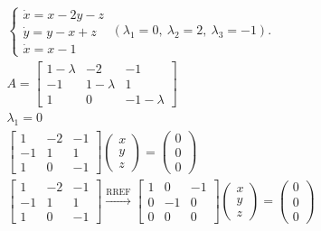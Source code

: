 \documentclass{article}
\begin{document}
\addtolength{\jot}{1pt}
\begin{fleqn}[1\parindent]
  \begin{gather*}
    \begin{cases}
      \dot{x}=x-2y-z \\ 
      \dot{y}=y-x+z \\ 
      \dot{x}=x-1
    \end{cases}\ (\lambda_1=0,\ \lambda_2=2,\ \lambda_3=-1). \\ 
    A =
    \begin{bmatrix}
      1-\lambda&-2&-1 \\ 
      -1 & 1-\lambda & 1 \\ 
      1 & 0 & -1-\lambda
    \end{bmatrix} \\ 
    \lambda_1 = 0 \\ 
    \begin{bmatrix}
      1 & -2 & -1 \\ 
      -1 & 1 & 1 \\ 
      1 & 0 & -1
    \end{bmatrix}
    \begin{pmatrix}
      x \\ y \\ z
    \end{pmatrix}
    =
    \begin{pmatrix}
      0 \\ 0 \\ 0
    \end{pmatrix} \\ 
    \begin{bmatrix}
      1 & -2 & -1 \\
      -1 & 1 & 1 \\
      1 & 0 & -1
    \end{bmatrix} \xrightarrow{\text{RREF}} \begin{bmatrix}
      1 & 0 & -1 \\ 
      0 & -1 & 0 \\ 
      0 & 0 & 0
    \end{bmatrix}
    \begin{pmatrix}
      x \\ y \\ z
    \end{pmatrix} = \begin{pmatrix}
      0 \\ 0 \\ 0
    \end{pmatrix} \\ 

\end{gather*}
\end{fleqn}
\end{document}
